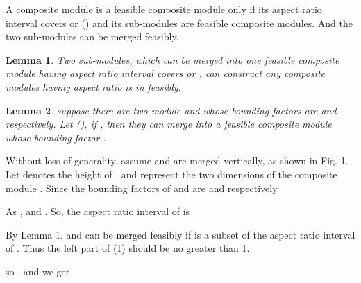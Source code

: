 \documentclass[conference]{IEEEtran}
\begin{document}
\begin{definition}
A composite module is a feasible composite module only if its aspect ratio interval covers  or  () and its sub-modules are feasible composite modules. And the two sub-modules can be merged feasibly.
\end{definition}

\newtheorem{lemma}{Lemma}
\begin{lemma}
Two sub-modules, which can be merged into one feasible composite module having aspect ratio interval covers  or , can construct any composite modules having aspect ratio is in  feasibly.
\end{lemma}



\begin{lemma}
suppose there are two module  and  whose bounding factors are  and  respectively. Let  (), if , then they can merge into a feasible composite module  whose bounding factor .

\end{lemma}

\begin{IEEEproof}
Without loss of generality, assume  and  are merged vertically, as shown in Fig. 1. Let  denotes the height of ,  and  represent the two dimensions of the composite module . Since the bounding factors of  and  are  and  respectively

\begin{center}

\end{center}








As ,  and . So, the aspect ratio interval of  is




By Lemma 1,  and  can be merged feasibly if  is a subset of the aspect ratio interval of . Thus the left part of (1) should be no greater than 1.


so , and we get









\end{IEEEproof}
\end{document}
